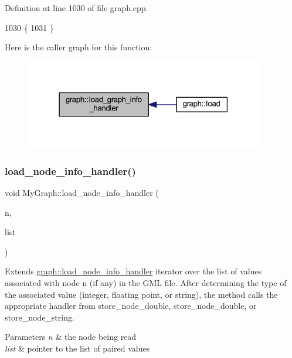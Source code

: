 Definition at line 1030 of file graph.\+cpp.


\begin{DoxyCode}
1030                                                 \{
1031 \}
\end{DoxyCode}
Here is the caller graph for this function\+:
\nopagebreak
\begin{figure}[H]
\begin{center}
\leavevmode
\includegraphics[width=295pt]{classgraph_aaca9ede8005388fd22b56e12280bf1bf_icgraph}
\end{center}
\end{figure}
\mbox{\label{class_my_graph_acef355f66e5aeb19265a9860f2920381}} 
\subsubsection{\texorpdfstring{load\+\_\+node\+\_\+info\+\_\+handler()}{load\_node\_info\_handler()}}
{\footnotesize\ttfamily void My\+Graph\+::load\+\_\+node\+\_\+info\+\_\+handler (\begin{DoxyParamCaption}\item[{\mbox{\hyperlink{classnode}{node}}}]{n,  }\item[{\mbox{\hyperlink{struct_g_m_l__pair}{G\+M\+L\+\_\+pair}} $\ast$}]{list }\end{DoxyParamCaption})\hspace{0.3cm}{\ttfamily [virtual]}}

Extends \mbox{\hyperlink{classgraph_ae956c361413410987a54e2296af2572f}{graph\+::load\+\_\+node\+\_\+info\+\_\+handler}} iterator over the list of values associated with node {\ttfamily n} (if any) in the G\+ML file. After determining the type of the associated value (integer, floating point, or string), the method calls the appropriate handler from store\+\_\+node\+\_\+double, store\+\_\+node\+\_\+double, or store\+\_\+node\+\_\+string. 
\begin{DoxyParams}{Parameters}
{\em n} & the node being read \\
\hline
{\em list} & pointer to the list of paired values \\
\hline
\end{DoxyParams}


